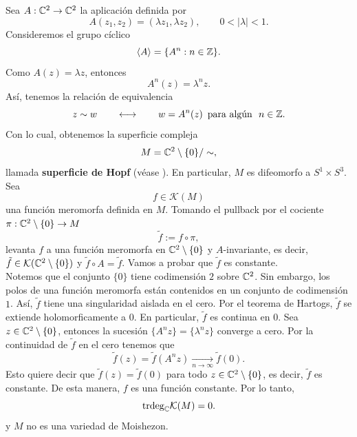 \begin{example}\label{hopfsuperficie}
	Sea $A:\mathbb{C}^2\to\mathbb{C}^2$ la aplicación definida por
	\begin{equation*}
		A(z_1,z_2)=(\lambda z_1,\lambda z_2),\qquad 0<|\lambda|<1.
	\end{equation*}
	Consideremos el grupo cíclico
	\begin{equation*}
		\langle A\rangle=\{A^n:n\in\mathbb{Z}\}.
	\end{equation*}
	Como $A(z)=\lambda z$, entonces
	\begin{equation*}
		A^n(z)=\lambda^n z.
	\end{equation*}
	Así, tenemos la relación de equivalencia
	\begin{equation*}
		z\sim w\qquad \longleftrightarrow\qquad w=A^n(z)\enspace \text{para algún }\ n\in\mathbb{Z}.
	\end{equation*}
	Con lo cual, obtenemos la superficie compleja
	\begin{equation*}
		M=\mathbb{C}^2\setminus\{0\}/\sim,
	\end{equation*}
	llamada \textbf{superficie de Hopf} (véase \parencite[Example 1.19]{leecomplex}). En particular, $M$ es difeomorfo a $S^1\times S^3$. Sea
	\begin{equation*}
		f\in\mathcal{K}(M)
	\end{equation*}
	una función meromorfa definida en $M$. Tomando el pullback por el cociente $\pi:\mathbb{C}^2\setminus\{0\}\to M$
	\begin{equation*}
		\tilde{f}:=f\circ\pi,
	\end{equation*}
	levanta $f$ a una función meromorfa en $\mathbb{C}^2\setminus\{0\}$ y $A$-invariante, es decir, $\tilde{f}\in\mathcal{K}(\mathbb{C}^2\setminus\{0\})$ y $\tilde{f}\circ A=\tilde{f}$. Vamos a probar que $\tilde{f}$ es constante.\\
	Notemos que el conjunto $\{0\}$ tiene codimensión $2$ sobre $\mathbb{C}^2$. Sin embargo, los polos de una función meromorfa están contenidos en un conjunto de codimensión $1$. Así, $\tilde{f}$ tiene una singularidad aislada en el cero. Por el teorema de Hartogs, $\tilde{f}$ se extiende holomorficamente a $0$. En particular, $\tilde{f}$ es continua en $0$.
	Sea $z\in \mathbb{C}^2\setminus\{0\}$, entonces la sucesión $\{A^nz\}=\{\lambda^nz\}$ converge a cero. Por la continuidad de $\tilde{f}$ en el cero tenemos que 
	\begin{equation*}
		\tilde{f}(z)=\tilde{f}(A^nz)\underset{n\to\infty}{\longrightarrow}\tilde{f}(0).
	\end{equation*}
	Esto quiere decir que $\tilde{f}(z)=\tilde{f}(0)$ para todo $z\in \mathbb{C}^2\setminus\{0\}$, es decir, $\tilde{f}$ es constante. De esta manera, $f$ es una función constante. Por lo tanto,
	\begin{equation*}
		\mathrm{trdeg}_{\mathbb{C}}\mathcal{K}(M)=0.
	\end{equation*} 
	y $M$ no es una variedad de Moishezon.
\end{example}

